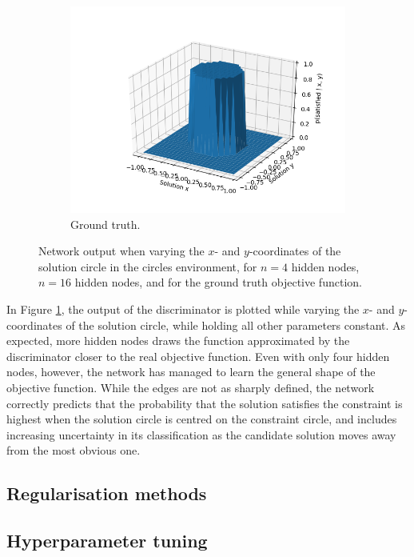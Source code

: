 \documentclass[a4paper]{article}
\begin{document}
\begin{figure}
  \begin{subfigure}[a]{.8\linewidth}
    \includegraphics[width=.8\linewidth]{../../figures/artificial-discriminator-true-objective-function.png}
    \caption{Ground truth.}
  \end{subfigure}
  \caption{
    Network output when varying the $x$- and $y$-coordinates of the solution circle in the circles environment,
    for $n=4$ hidden nodes, $n=16$ hidden nodes, and for the ground truth objective function.
  }
\label{fig:artificialDiscriminator}
\end{figure}

In Figure \ref{fig:artificialDiscriminator}, the output of the discriminator is plotted while varying the $x$- and $y$-coordinates
of the solution circle, while holding all other parameters constant.
As expected, more hidden nodes draws the function approximated by the discriminator closer to the real objective function.
Even with only four hidden nodes, however, the network has managed to learn the general shape of the objective function.
While the edges are not as sharply defined, the network correctly predicts that the probability that the solution satisfies
the constraint is highest when the solution circle is centred on the constraint circle, and includes increasing
uncertainty in its classification as the candidate solution moves away from the most obvious one.

\subsection{Regularisation methods}



\subsection{Hyperparameter tuning}
\end{document}

